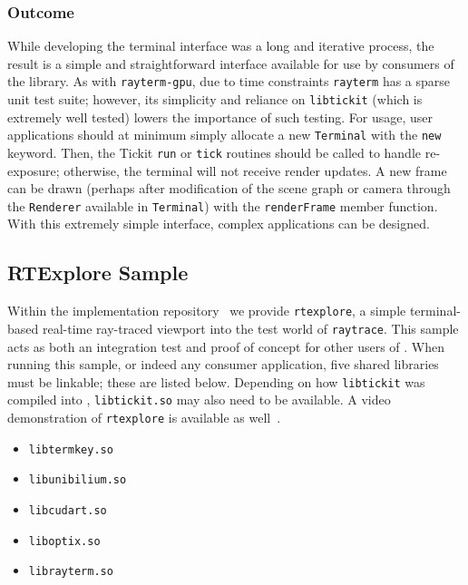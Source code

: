 \subsubsection{Outcome} \label{ch:methods:interface:tickit:outcome}

While developing the terminal interface was a long and iterative process, the result is a simple and straightforward interface available for use by consumers of the \name{} library.
As with \texttt{rayterm-gpu}, due to time constraints \texttt{rayterm} has a sparse unit test suite; however, its simplicity and reliance on \texttt{libtickit} (which is extremely well tested) lowers the importance of such testing.
For usage, user applications should at minimum simply allocate a new \texttt{Terminal} with the \texttt{new} keyword.
Then, the Tickit \texttt{run} or \texttt{tick} routines should be called to handle re-exposure; otherwise, the terminal will not receive render updates.
A new frame can be drawn (perhaps after modification of the scene graph or camera through the \texttt{Renderer} available in \texttt{Terminal}) with the \texttt{renderFrame} member function.
With this extremely simple interface, complex applications can be designed.


\subsection{RTExplore Sample} \label{ch:methods:interface:sample}

Within the \name{} implementation repository~\cite{raytermGpuImpl} we provide \texttt{rtexplore}, a simple terminal-based real-time ray-traced viewport into the test world of \texttt{raytrace}.
This sample acts as both an integration test and proof of concept for other users of \name{}.
When running this sample, or indeed any \name{} consumer application, five shared libraries must be linkable; these are listed below.
Depending on how \texttt{libtickit} was compiled into \name{}, \texttt{libtickit.so} may also need to be available.
A video demonstration of \texttt{rtexplore} is available as well~\cite{raytermDemo}.

\vspace{-0.5em}
\begin{itemize}
  \vspace{-0.5em}
  \item \texttt{libtermkey.so}
  \vspace{-0.5em}
  \item \texttt{libunibilium.so}
  \vspace{-0.5em}
  \item \texttt{libcudart.so}
  \vspace{-0.5em}
  \item \texttt{liboptix.so}
  \vspace{-0.5em}
  \item \texttt{librayterm.so}
  \vspace{-0.5em}
\end{itemize}
\vspace{-0.5em}

